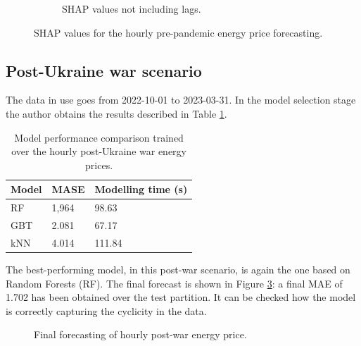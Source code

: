 \begin{figure}[H]
\begin{subfigure}[t]{.45\textwidth}
        \caption{SHAP values not including lags.}
        \label{fig:shap-hourly-pre-nolags}
    \end{subfigure}

    \caption{SHAP values for the hourly pre-pandemic energy price forecasting.}
    \label{fig:shap-hourly-pre}
\end{figure}

\subsection{Post-Ukraine war scenario}
The data in use goes from 2022-10-01 to 2023-03-31. In the model selection stage the author obtains the results described in Table \ref{tab:cv-hourly-post}.

\begin{table}[H]
\centering
\begin{tabular}{@{}l|l|l@{}}
\toprule
Model & MASE  & Modelling time (s)  \\ \midrule
RF    & 1,964 & 98.63               \\
GBT   & 2.081 & 67.17               \\
kNN   & 4.014 & 111.84              \\ \bottomrule
\end{tabular}
\caption{Model performance comparison trained over the hourly post-Ukraine war energy prices.}
\label{tab:cv-hourly-post}
\end{table}

The best-performing model, in this post-war scenario, is again the one based on Random Forests (RF). The final forecast is shown in Figure \ref{fig:forecast-hourly-post}: a final MAE of 1.702 has been obtained over the test partition. It can be checked how the model is correctly capturing the cyclicity in the data.

\begin{figure}[H]
\centering
    \caption{Final forecasting of hourly post-war energy price.}
    \label{fig:forecast-hourly-post}
\end{figure}

